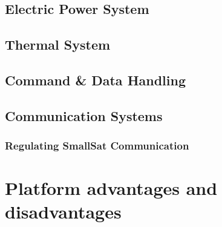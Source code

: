 \subsection{Electric Power System}
\label{subsec:Power}

\lipsum

\subsection{Thermal System}
\label{subsec:Thermal}

\lipsum

\subsection{Command \& Data Handling}
\label{subsec:C_DH}

\lipsum

\subsection{Communication Systems}
\label{subsec:Comm}

\lipsum

\subsubsection{Regulating SmallSat Communication}
\label{subsec:Reg_Comm}

\lipsum


\section{Platform advantages and disadvantages}
\label{sec:SmallSat_AdvantDisadvanteges}

\lipsum



